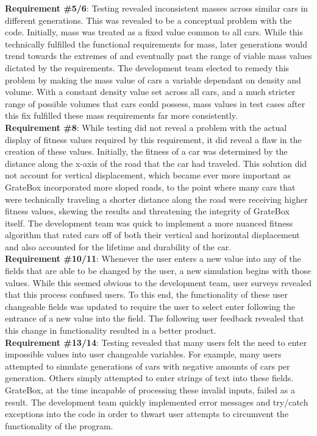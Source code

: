 \documentclass[12pt, titlepage]{article}
\begin{document}
\textbf{Requirement \#5/6}: Testing revealed inconsistent masses across similar cars in different generations. This was revealed to be a conceptual problem with the code. Initially, mass was treated as a fixed value common to all cars. While this technically fulfilled the functional requirements for mass, later generations would trend towards the extremes of and eventually past the range of viable mass values dictated by the requirements. The development team elected to remedy this problem by making the mass value of cars a variable dependant on density and volume. With a constant density value set across all cars, and a much stricter range of possible volumes that cars could possess, mass values in test cases after this fix fulfilled these mass requirements far more consistently.\\

\textbf{Requirement \#8}: While testing did not reveal a problem with the actual display of fitness values required by this requirement, it did reveal a flaw in the creation of these values. Initially, the fitness of a car was determined by the distance along the x-axis of the road that the car had traveled. This solution did not account for vertical displacement, which became ever more important as GrateBox incorporated more sloped roads, to the point where many cars that were technically traveling a shorter distance along the road were receiving higher fitness values, skewing the results and threatening the integrity of GrateBox itself. The development team was quick to implement a more nuanced fitness algorithm that rated cars off of both their vertical and horizontal displacement and also accounted for the lifetime and durability of the car.\\

\textbf{Requirement \#10/11}: Whenever the user enters a new value into any of the fields that are able to be changed by the user, a new simulation begins with those values. While this seemed obvious to the development team, user surveys revealed that this process confused users. To this end, the functionality of these user changeable fields was updated to require the user to select enter following the entrance of a new value into the field. The following user feedback revealed that this change in functionality resulted in a better product.\\

\textbf{Requirement \#13/14}: Testing revealed that many users felt the need to enter impossible values into user changeable variables. For example, many users attempted to simulate generations of cars with negative amounts of cars per generation. Others simply attempted to enter strings of text into these fields. GrateBox, at the time incapable of processing these invalid inputs, failed as a result. The development team quickly implemented error messages and try/catch exceptions into the code in order to thwart user attempts to circumvent the functionality of the program.\\
\end{document}
